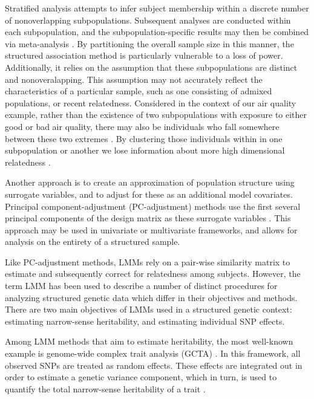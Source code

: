 Stratified analysis attempts to infer subject membership within a discrete number of nonoverlapping subpopulations. Subsequent analyses are conducted within each subpopulation, and the subpopulation-specific results may then be combined via meta-analysis \cite{pritchard1999use, pritchard2000association}. By partitioning the overall sample size in this manner, the structured association method is particularly vulnerable to a loss of power. Additionally, it relies on the assumption that these subpopulations are distinct and nonoveralapping. This assumption may not accurately reflect the characteristics of a particular sample, such as one consisting of admixed populations, or recent relatedness. Considered in the context of our air quality example, rather than the existence of two subpopulations with exposure to either good or bad air quality, there may also be individuals who fall somewhere between these two extremes . By clustering those individuals within in one subpopulation or another we lose information about more high dimensional relatedness .

Another approach is to create an approximation of population structure using surrogate variables, and to adjust for these as an additional model covariates. Principal component-adjustment (PC-adjustment) methods use the first several principal components of the design matrix as these surrogate variables \cite{price2006principal}. This approach may be used in univariate or multivariate frameworks, and allows for analysis on the entirety of a structured sample. 

Like PC-adjustment methods, LMMs rely on a pair-wise similarity matrix  to estimate and subsequently correct for relatedness among subjects. However, the term LMM has been used to describe a number of distinct procedures for analyzing structured genetic data which differ in their objectives and methods. There are two main objectives of LMMs used in a structured genetic context: estimating narrow-sense heritability, and estimating individual SNP effects.

Among LMM methods that aim to estimate heritability, the most well-known example is genome-wide complex trait analysis (GCTA) \cite{yang2011gcta}. In this framework, all observed SNPs are treated as random effects. These effects are integrated out in order to estimate a genetic variance component, which in turn, is used to quantify the total narrow-sense heritability of a trait \cite{yang2010common}.


